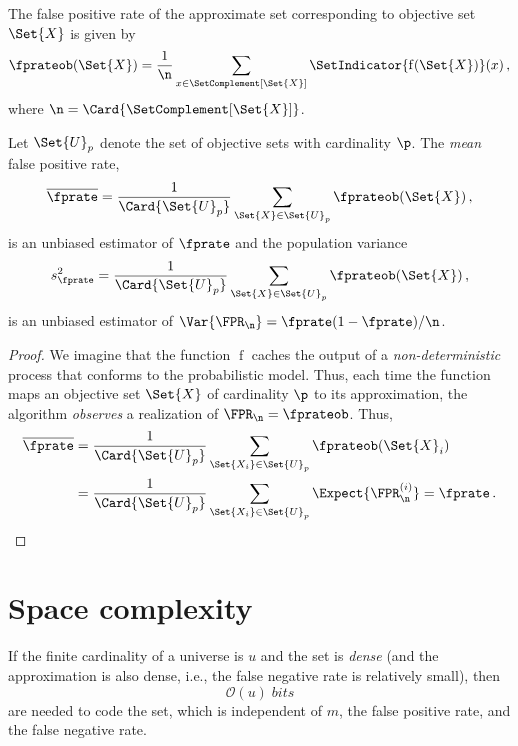 \documentclass[ ../main.tex]{subfiles}
\begin{document}
The false positive rate of the approximate set corresponding 
to objective set $\Set{X}$ is given by
\begin{equation}
    \fprateob(\Set{X}) = \frac{1}{\n} \sum_{x \in \SetComplement[\Set{X}]} \SetIndicator{\operatorname{f}(\Set{X})}(x)\,,
\end{equation}
where $\n = \Card{\SetComplement[\Set{X}]}$.

Let $\Set{U}_p$ denote the set of objective sets with cardinality $\p$. The 
\emph{mean} false positive rate,
\begin{equation}
    \overline{\fprate} = \frac{1}{\Card{\Set{U}_p}}
        \sum_{\Set{X} \in \Set{U}_p} \fprateob(\Set{X})\,,
\end{equation}
is an unbiased estimator of $\fprate$ and the population variance
\begin{equation}
    s^2_\fprate = \frac{1}{\Card{\Set{U}_p}}
        \sum_{\Set{X} \in \Set{U}_p} \fprateob(\Set{X})\,,
\end{equation}
is an unbiased estimator of $\Var{\FPR_\n} = \fprate(1-\fprate)/\n$.
\begin{proof}
We imagine that the function $\operatorname{f}$ caches the output of a 
\emph{non-deterministic} process that conforms to the probabilistic model. Thus, 
each time the function maps an objective set $\Set{X}$ of cardinality $\p$ to 
its approximation, the algorithm \emph{observes} a realization of 
$\FPR_\n = \fprateob$. Thus,
\begin{align}
    \overline{\fprate}
        &= \frac{1}{\Card{\Set{U}_p}} 
            \sum_{\Set{X_i} \in \Set{U}_p} \fprateob(\Set{X}_i)\\
        &= \frac{1}{\Card{\Set{U}_p}} 
            \sum_{\Set{X_i} \in \Set{U}_p} \Expect{\FPR_\n^{(i)}} = \fprate\,.
\end{align}
\end{proof}

\section{Space complexity}
\label{sec:space_comp}
If the finite cardinality of a universe is $u$ and the set is \emph{dense} (and 
the approximation is also dense, i.e., the false negative rate is relatively 
small), then
\begin{equation}
    \mathcal{O}(u) \; \si{bits}
\end{equation}
are needed to code the set, which is independent of $m$, the false positive 
rate, and the false negative rate.
\end{document}
